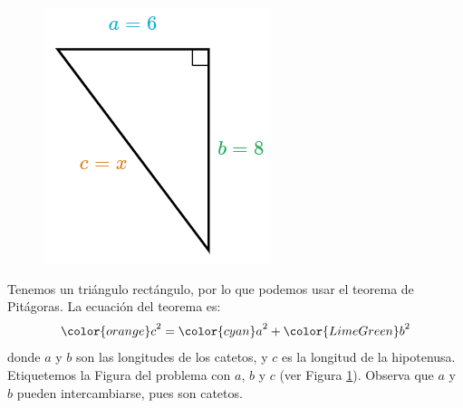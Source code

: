 \begin{minipage}[t][][t]{0.6\textwidth}
    \begin{solutionbox}{9.5cm}
        \begin{minipage}{0.4\textwidth}
            \begin{figure}[H]
                \centering
                \includegraphics[width=0.95\linewidth]{../images/lados_pitagoras_02a.png}
                \caption{}
                \label{fig:lados_pitagoras_02a}
            \end{figure}
        \end{minipage}\hfill
        \begin{minipage}{0.55\textwidth}
            Tenemos un triángulo rectángulo, por lo que podemos usar el teorema de Pitágoras.
            La ecuación del teorema es:
            \[{\color{orange}c}^2={\color{cyan}a}^2+{\color{LimeGreen}b}^2\]
            donde $a$ y $b$ son las longitudes de los catetos, y $c$ es la longitud de la hipotenusa.
            Etiquetemos la Figura del problema con $a$, $b$ y $c$ (ver Figura \ref{fig:lados_pitagoras_02a}).
            Observa que $a$ y $b$ pueden intercambiarse, pues son catetos.
        \end{minipage}
        \begin{align*}

\end{align*}
\end{solutionbox}
\end{minipage}
